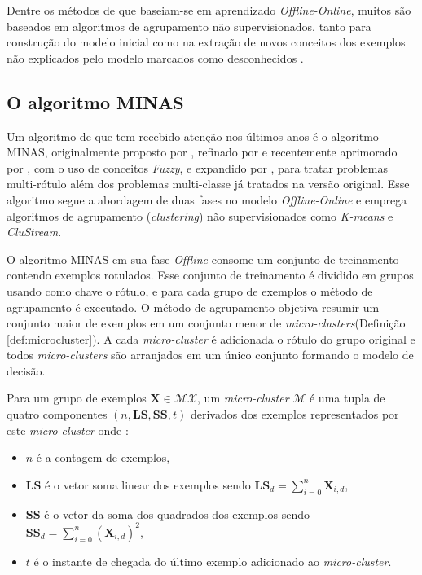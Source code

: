 Dentre os métodos de \nd que baseiam-se em aprendizado \emph{Offline-Online},
muitos são baseados em algoritmos de agrupamento não supervisionados, tanto
para construção do modelo inicial como na extração de novos conceitos dos
exemplos não explicados pelo modelo marcados como desconhecidos
\cite{Spinosa2009ollinda,Masud2010ECSMiner,Faria2013Minas}.

\subsection{O algoritmo MINAS}\label{sec:minas-og}

Um algoritmo de \nd que tem recebido atenção nos últimos anos é o algoritmo
MINAS, originalmente proposto por , refinado por
 e recentemente aprimorado por
, com o uso de conceitos \emph{Fuzzy}, e expandido por
, para tratar problemas multi-rótulo além dos problemas
multi-classe já tratados na versão original.
Esse algoritmo segue a abordagem de duas fases no modelo \emph{Offline-Online} e
emprega algoritmos de agrupamento (\emph{clustering}) não supervisionados como
\emph{K-means} e \emph{CluStream}.

\newcommand{\mcluster}{\emph{micro-cluster}\xspace}
\newcommand{\mclusters}{\emph{micro-clusters}\xspace}

O algoritmo MINAS em sua fase \emph{Offline} consome um conjunto de treinamento
contendo exemplos rotulados.
Esse conjunto de treinamento é dividido em grupos usando como chave o rótulo,
e para cada grupo de exemplos o método de agrupamento é executado.
O método de agrupamento objetiva resumir um conjunto maior de exemplos em um
conjunto menor de \mclusters (Definição \ref{def:microcluster}).
A cada \mcluster é adicionada o rótulo do grupo original e todos \mclusters
são arranjados em um único conjunto formando o modelo de decisão.

\begin{definition}
  Para um grupo de exemplos $\mathbf{X} \in \mathcal{MX}$, um \mcluster
  $\mathcal{M}$ é uma tupla de quatro componentes $(n, \mathbf{LS}, \mathbf{SS}, t)$
  derivados dos exemplos representados por este \mcluster onde \cite{Aggarwal2003,Faria2016minas}:
  \begin{itemize}
    \item $n$ é a contagem de exemplos,
    \item $\mathbf{LS}$ é o vetor soma linear dos exemplos sendo $\mathbf{LS}_d = \sum_{i=0}^{n} \mathbf{X}_{i,d}$,
    \item $\mathbf{SS}$ é o vetor da soma dos quadrados dos exemplos sendo $\mathbf{SS}_d = \sum_{i=0}^{n} (\mathbf{X}_{i,d})^2$,
    \item $t$ é o instante de chegada do último exemplo adicionado ao \mcluster.
  \end{itemize}
  \label{def:microcluster}
\end{definition}

